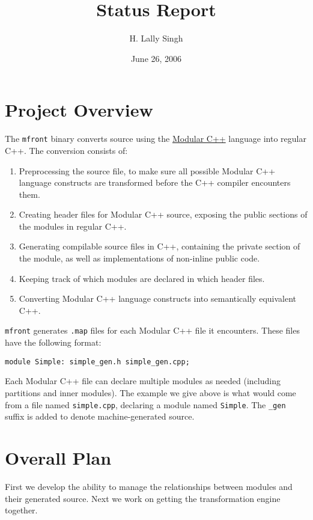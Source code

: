\documentclass[leqno,fleqn, twocolumn]{article}
\begin{document}
\title{Status Report}
\author{H. Lally Singh}
\date{June 26, 2006}
\maketitle

\section{Project Overview}
The \texttt{mfront} binary converts source using the \href{http://www.open-std.org/jtc1/sc22/wg21/docs/papers/2006/n1964.pdf}{Modular C++} language into regular C++.  The conversion consists of:
\begin{enumerate}
\item Preprocessing the source file, to make sure all possible Modular C++ language constructs are transformed before the C++ compiler encounters them.
\item Creating header files for Modular C++ source, exposing the public sections of the modules in regular C++.
\item Generating compilable source files in C++, containing the private section of the module, as well as implementations of non-inline public code.
\item Keeping track of which modules are declared in which header files.
\item Converting Modular C++ language constructs into semantically equivalent C++.
\end{enumerate}

\texttt{mfront} generates \texttt{.map} files for each Modular C++ file it encounters.  These files have the following format:
\begin{verbatim}
module Simple: simple_gen.h simple_gen.cpp;
\end{verbatim}

Each Modular C++ file can declare multiple modules as needed (including partitions and inner modules).  The example we give above is what would come from a file named \texttt{simple.cpp}, declaring a module named \texttt{Simple}.  The \texttt{\_gen} suffix is added to denote machine-generated source.


\section{Overall Plan}
First we develop the ability to manage the relationships between modules and their generated source.  Next we work on getting the transformation engine together.  
\end{document}
